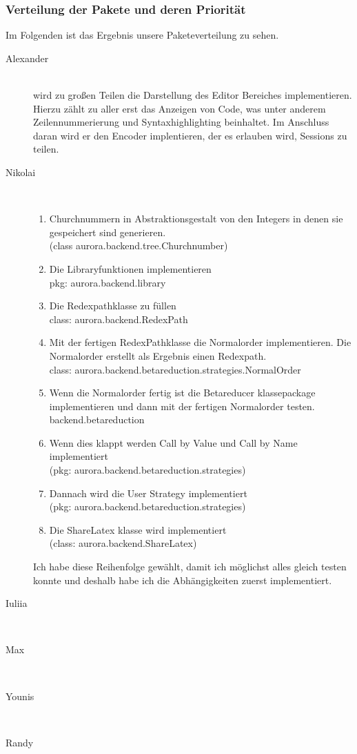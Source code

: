 \documentclass[parskip=full,11pt,twoside]{scrartcl}
\begin{document}
\subsubsection{Verteilung der Pakete und deren Priorität}
Im Folgenden ist das Ergebnis unsere Paketeverteilung zu sehen.
\begin{description}


    \item [Alexander]\hfill \\
      wird zu großen Teilen die Darstellung des Editor Bereiches implementieren. 
        Hierzu zählt zu aller erst das Anzeigen von Code, was unter anderem Zeilennummerierung und Syntaxhighlighting beinhaltet.
        Im Anschluss daran wird er den Encoder implentieren, der es erlauben wird, Sessions zu teilen.
    \item [Nikolai]\hfill \\
    \begin{enumerate}
    \item Churchnummern in Abstraktionsgestalt von den Integers in denen sie gespeichert sind generieren. \\(class aurora.backend.tree.Churchnumber)
    \item  Die Libraryfunktionen implementieren \\pkg: aurora.backend.library
    \item Die Redexpathklasse zu füllen \\class: aurora.backend.RedexPath
    \item Mit der fertigen RedexPathklasse die Normalorder implementieren. Die Normalorder erstellt als Ergebnis einen Redexpath. \\class: aurora.backend.betareduction.strategies.NormalOrder
    \item Wenn die Normalorder fertig ist die Betareducer klassepackage implementieren und dann mit der fertigen Normalorder testen. backend.betareduction
    \item Wenn dies klappt werden Call by Value und Call by Name implementiert  \\(pkg: aurora.backend.betareduction.strategies)
\item Dannach wird die User Strategy implementiert \\(pkg: aurora.backend.betareduction.strategies)

\item Die ShareLatex klasse wird implementiert \\(class: aurora.backend.ShareLatex)
    \end{enumerate}
Ich habe diese Reihenfolge gewählt, damit ich möglichst alles gleich testen konnte und deshalb habe ich die Abhängigkeiten zuerst implementiert.
    \item [Iuliia]\hfill \\
    \item [Max]\hfill \\
    \item [Younis]\hfill \\
    \item [Randy]\hfill \\
\end{description}
\end{document}
